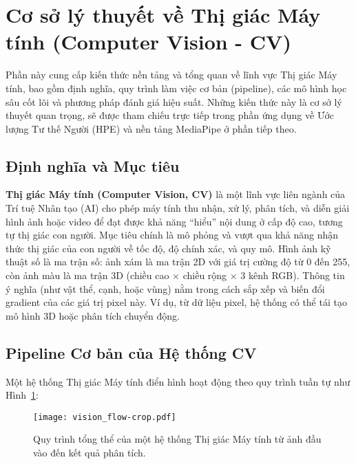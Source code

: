 \section{Cơ sở lý thuyết về Thị giác Máy tính (Computer Vision - CV)}

Phần này cung cấp kiến thức nền tảng và tổng quan về lĩnh vực Thị giác Máy tính, bao gồm định nghĩa, quy trình làm việc cơ bản (pipeline), các mô hình học sâu cốt lõi và phương pháp đánh giá hiệu suất. Những kiến thức này là cơ sở lý thuyết quan trọng, sẽ được tham chiếu trực tiếp trong phần ứng dụng về Ước lượng Tư thế Người (HPE) và nền tảng MediaPipe ở phần tiếp theo.

\subsection{Định nghĩa và Mục tiêu}
\textbf{Thị giác Máy tính (Computer Vision, CV)} là một lĩnh vực liên ngành của Trí tuệ Nhân tạo (AI) cho phép máy tính thu nhận, xử lý, phân tích, và diễn giải hình ảnh hoặc video để đạt được khả năng ``hiểu'' nội dung ở cấp độ cao, tương tự thị giác con người. Mục tiêu chính là mô phỏng và vượt qua khả năng nhận thức thị giác của con người về tốc độ, độ chính xác, và quy mô.\autocite{szeliski2010} Hình ảnh kỹ thuật số là ma trận số: ảnh xám là ma trận 2D với giá trị cường độ từ 0 đến 255, còn ảnh màu là ma trận 3D (chiều cao $\times$ chiều rộng $\times$ 3 kênh RGB). Thông tin ý nghĩa (như vật thể, cạnh, hoặc vùng) nằm trong cách sắp xếp và biến đổi gradient của các giá trị pixel này.\autocite{lowe1999} Ví dụ, từ dữ liệu pixel, hệ thống có thể tái tạo mô hình 3D hoặc phân tích chuyển động.

\subsection{Pipeline Cơ bản của Hệ thống CV}
Một hệ thống Thị giác Máy tính điển hình hoạt động theo quy trình tuần tự như Hình~\ref{fig:cv_pipeline}:

\begin{figure}[h]
    \centering
    \texttt{[image: vision\_flow-crop.pdf]}
    \caption{Quy trình tổng thể của một hệ thống Thị giác Máy tính từ ảnh đầu vào đến kết quả phân tích.}
    \label{fig:cv_pipeline}
\end{figure}

